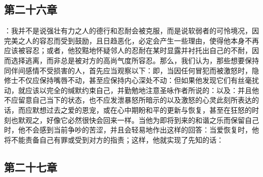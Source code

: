 \subsection{第二十六章}

\par

：我并不是说强壮有力之人的德行和忍耐会被克服，而是说软弱者的可怜境况，因完美之人的容忍而受到鼓励，且日趋恶化，必定会产生一些理由，使得他本身不再应该被容忍；或者，他狡黠地怀疑邻人的忍耐在某时显露并衬托出自己的不耐，因而选择逃离，而非总是被对方的高尚气度所容忍。那么，我们认为，那些想要保持同伴间感情不受损害的人，首先应当观察以下：即，当因任何冒犯而被激怒时，隐修士不仅应保持嘴唇不动，甚至应保持内心深处不动：但如果他发现它们有丝毫扰动，就应该以完全的缄默约束自己，并勤勉地注意圣咏作者所说的：以及：并且他不应留意自己当下的状态，也不应发泄暴怒所暗示的以及激怒的心灵此刻所表达的话，而应默想过去之爱的恩宠，或在心中期盼和平的更新与恢复，甚至在狂怒的时刻也默观之，好像它必然很快会回来一样。当他为即将到来的和谐之乐而保留自己时，他不会感到当前争吵的苦涩，并且会轻易地作出这样的回答：当爱恢复时，他将不能责备自己有罪或受到对方的指责；这样，他就实现了先知的话：\par


\subsection{第二十七章}

\par

